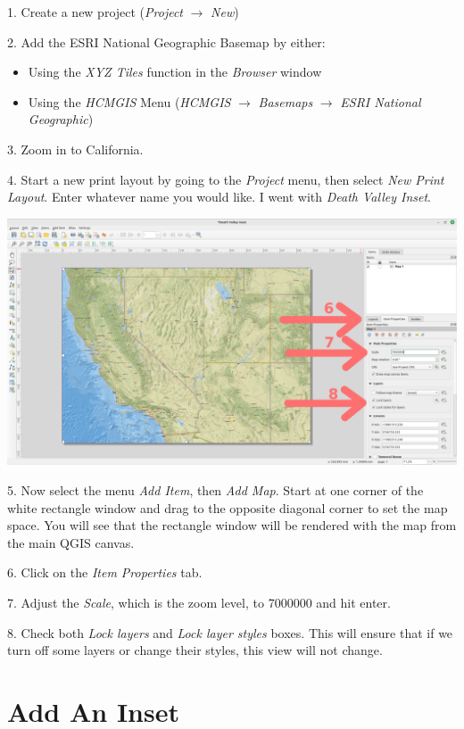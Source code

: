 \documentclass[oneside,a4paper,11pt,explicit]{book}
\begin{document}
1. Create a new project (\textit{Project} $\rightarrow$ \textit{New})

\begin{singlespace}
2. Add the ESRI National Geographic Basemap by either:
	\begin{itemize}
		\item Using the \textit{XYZ Tiles} function in the \textit{Browser} window
		\item Using the \textit{HCMGIS} Menu (\textit{HCMGIS} $\rightarrow$ \textit{Basemaps} $\rightarrow$ \textit{ESRI National Geographic})
	\end{itemize}
\end{singlespace}

3. Zoom in to California.

4. Start a new print layout by going to the \textit{Project} menu, then select \textit{New Print Layout}. Enter whatever name you would like. I went with \textit{Death Valley Inset}.


\centerline{\includegraphics[width=\textwidth]{InsetItem.png}}

5. Now select the menu \textit{Add Item}, then \textit{Add Map}. Start at one corner of the white rectangle window and drag to the opposite diagonal corner to set the map space. You will see that the rectangle window will be rendered with the map from the main QGIS canvas.

6. Click on the \textit{Item Properties} tab.

7. Adjust the \textit{Scale}, which is the zoom level, to 7000000 and hit enter.

8. Check both \textit{Lock layers} and \textit{Lock layer styles} boxes. This will ensure that if we turn off some layers or change their styles, this view will not change.


\section{Add An Inset}
\end{document}
